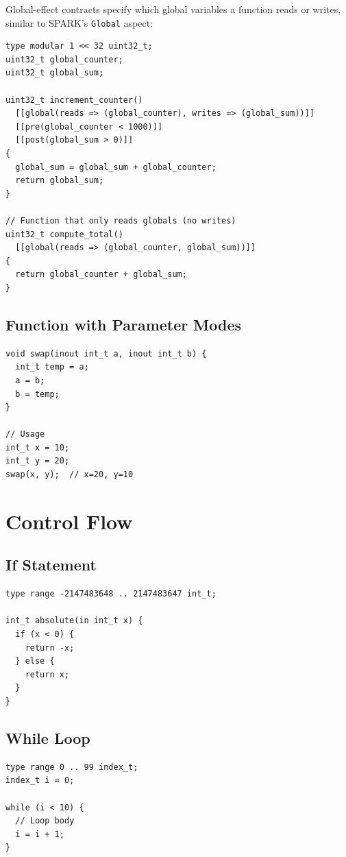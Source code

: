 \documentclass[11pt,letterpaper,twoside,openany]{book}
\begin{document}
Global-effect contracts specify which global variables a function reads or writes, similar to SPARK's \verb'Global' aspect:

\begin{lstlisting}
type modular 1 << 32 uint32_t;
uint32_t global_counter;
uint32_t global_sum;

uint32_t increment_counter()
  [[global(reads => (global_counter), writes => (global_sum))]]
  [[pre(global_counter < 1000)]]
  [[post(global_sum > 0)]]
{
  global_sum = global_sum + global_counter;
  return global_sum;
}

// Function that only reads globals (no writes)
uint32_t compute_total()
  [[global(reads => (global_counter, global_sum))]]
{
  return global_counter + global_sum;
}
\end{lstlisting}

\subsection{Function with Parameter Modes}
\begin{lstlisting}
void swap(inout int_t a, inout int_t b) {
  int_t temp = a;
  a = b;
  b = temp;
}

// Usage
int_t x = 10;
int_t y = 20;
swap(x, y);  // x=20, y=10
\end{lstlisting}

\section{Control Flow}

\subsection{If Statement}
\begin{lstlisting}
type range -2147483648 .. 2147483647 int_t;

int_t absolute(in int_t x) {
  if (x < 0) {
    return -x;
  } else {
    return x;
  }
}
\end{lstlisting}

\subsection{While Loop}
\begin{lstlisting}
type range 0 .. 99 index_t;
index_t i = 0;

while (i < 10) {
  // Loop body
  i = i + 1;
}
\end{lstlisting}
\end{document}
